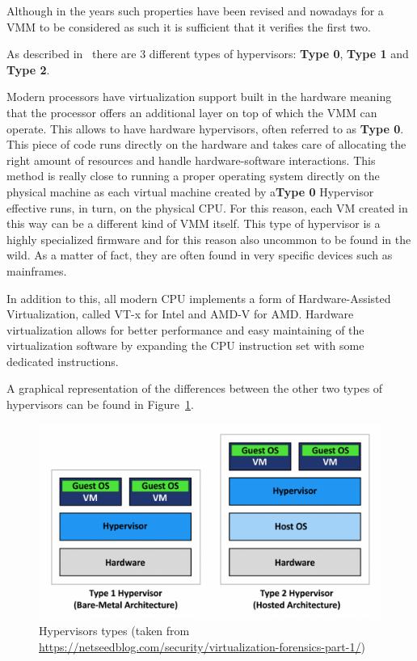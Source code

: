 Although in the years such properties have been revised and nowadays for a VMM to be considered as such it is sufficient that it verifies the first two. 

As described in~\cite{os} there are 3 different types of hypervisors: \textbf{Type 0}, \textbf{Type 1} and \textbf{Type 2}. 

Modern processors have virtualization support built in the hardware meaning that the processor offers an additional layer on top of which the VMM can operate. This allows to have hardware hypervisors, often referred to as \textbf{Type 0}. This piece of code runs directly on the hardware and takes care of allocating the right amount of resources and handle hardware-software interactions. This method is really close to running a proper operating system directly on the physical machine as each virtual machine created by a\textbf{Type 0} Hypervisor effective runs, in turn, on the physical CPU. For this reason, each VM created in this way can be a different kind of VMM itself. This type of hypervisor is a highly specialized firmware and for this reason also uncommon to be found in the wild. As a matter of fact, they are often found in very specific devices such as mainframes. 

In addition to this, all modern CPU implements a form of Hardware-Assisted Virtualization, called VT-x for Intel and AMD-V for AMD. Hardware virtualization allows for better performance and easy maintaining of the virtualization software by expanding the CPU instruction set with some dedicated instructions. 

A graphical representation of the differences between the other two types of hypervisors can be found in Figure~\ref{fig:hip}.

\begin{figure}[htp]
\centering
\includegraphics[width=\linewidth]{images/hip.png}
\caption{Hypervisors types (taken from  \url{https://netseedblog.com/security/virtualization-forensics-part-1/})}
\label{fig:hip}
\end{figure}



